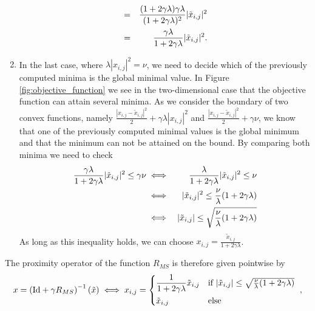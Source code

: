 \documentclass[abstracton]{scrreprt}
\begin{document}
\begin{enumerate}
\begin{eqnarray}
                            &=& \frac{(1 + 2\gamma\lambda)\gamma\lambda}{(1 + 2\gamma\lambda)^{2}} |\tilde{x}_{i,j}|^{2} \notag \\
                            &=& \frac{\gamma\lambda}{1 + 2\gamma\lambda} |\tilde{x}_{i,j}|^{2}. \label{eq:bound_on_p}
                        \end{eqnarray}
                    \item In the last case, where $\lambda |x_{i,j}|^{2} = \nu$, we need to decide which of the previously computed minima is the global minimal value. In Figure \ref{fig:objective_function} we see in the two-dimensional case that the objective function can attain several minima. As we consider the boundary of two convex functions, namely $\frac{|x_{i,j} - \tilde{x}_{i,j}|^{2}}{2} + \gamma \lambda |x_{i,j}|^{2}$ and $\frac{|x_{i,j} - \tilde{x}_{i,j}|^{2}}{2} + \gamma \nu$, we know that one of the previously computed minimal values is the global minimum and that the minimum can not be attained on the bound. By comparing both minima we need to check
                        \begin{eqnarray}
                            \frac{\gamma\lambda}{1 + 2\gamma\lambda} |\tilde{x}_{i,j}|^{2} \le \gamma \nu &\iff& \frac{\lambda}{1 + 2\gamma\lambda} |\tilde{x}_{i,j}|^{2} \le \nu \label{eq:minimal_energy} \\
                            &\iff& |\tilde{x}_{i,j}|^{2} \le \frac{\nu}{\lambda}(1 + 2\gamma\lambda) \notag \\
                            &\iff& |\tilde{x}_{i,j}| \le \sqrt{\frac{\nu}{\lambda}(1 + 2\gamma\lambda)} \notag
                        \end{eqnarray}
                    As long as this inequality holds, we can choose $x_{i,j} = \frac{\tilde{x}_{i,j}}{1 + 2 \gamma \lambda}$.
                \end{enumerate}
            The proximity operator of the function $R_{MS}$ is therefore given pointwise by
                \begin{equation}
                    x = \left( \textnormal{Id} + \gamma R_{MS} \right)^{-1}(\tilde{x}) \iff x_{i,j} =
                    \begin{dcases*}
                        \frac{1}{1 + 2\gamma\lambda}\tilde{x}_{i,j} & \textnormal{if $|\tilde{x}_{i,j}| \le \sqrt{\frac{\nu}{\lambda}(1 + 2\gamma\lambda)}$} \\
                        \tilde{x}_{i,j} & \textnormal{else}
                    \end{dcases*},
                    \label{eq:proximity_operator_R}
                \end{equation}
\end{document}
